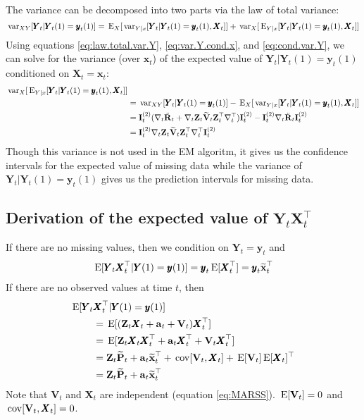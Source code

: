 \documentclass[]{article}
\def\XI{\mbox{\boldmath $\Xi$}}
\def\E{\,\textup{\textrm{E}}}
\def\IIm{\mbox{$\mathbf I$}}
\def\PP{\mbox{$\mathbf P$}}  \def\pp{\mbox{$\mathbf p$}}
\def\RR{\mbox{$\mathbf R$}}	 \def\rr{\mbox{$\mathbf r$}} \def\Rb{\mbox{$\mathbf H$}}	\def\Rm{\mathbb{R}}
\def\VV{\mbox{$\mathbf V$}}	\def\vv{\mbox{$\mathbf v$}}
\def\XX{\mbox{$\pmb{X}$}}	\def\xx{\mbox{$\pmb{x}$}}
\def\YY{\mbox{$\pmb{Y}$}}	\def\yy{\mbox{$\pmb{y}$}}
\def\ZZ{\mbox{$\mathbf Z$}}	\def\zz{\mbox{$\mathbf z$}}	\def\Zb{\mbox{$\mathbf M$}} \def\Za{\mbox{$\mathbf N$}} \def\Zm{\XI}
\def\var{\,\textup{\textrm{var}}}
\def\cov{\,\textup{\textrm{cov}}}
\def\hatxt{\widetilde{\mbox{$\mathbf x$}}_t}
\def\hatPt{\widetilde{\PP}_t}
\def\hatVt{\widetilde{\VV}_t}
\def\IR{\nabla}
\begin{document}
The variance can be decomposed into two parts via the law of total variance:
\begin{equation}\label{eq:law.total.var.Y}
\var_{XY}[\YY_t|\YY_t(1)=\yy_t(1)] = \E_X[\var_{Y|x}[\YY_t|\YY_t(1)=\yy_t(1),\XX_t]] + 
\var_X[\E_{Y|x}[\YY_t|\YY_t(1)=\yy_t(1),\XX_t]]
\end{equation}
Using equations \ref{eq:law.total.var.Y}, \ref{eq:var.Y.cond.x}, and \ref{eq:cond.var.Y}, we can solve for the variance (over $\xx_t$) of the expected value of $\YY_t|\YY_t(1)=\yy_t(1)$ conditioned on $\XX_t=\xx_t$:
\begin{equation}
\begin{split}
\var_X[\E_{Y|x}[\YY_t|\YY_t(1)=\yy_t(1),\XX_t]] & \\
&= \var_{XY}[\YY_t|\YY_t(1)=\yy_t(1)] - \E_X[\var_{Y|x}[\YY_t|\YY_t(1)=\yy_t(1),\XX_t]] \\
&= \IIm_t^{(2)}(\IR_t\ddot{\RR}_t + \IR_t\ZZ_t\hatVt\ZZ_t^\top\IR_t^\top)\IIm_t^{(2)} - \IIm_t^{(2)}\IR_t\ddot{\RR}_t\IIm_t^{(2)} \\
&= \IIm_t^{(2)}\IR_t\ZZ_t\hatVt\ZZ_t^\top\IR_t^\top\IIm_t^{(2)}
\end{split}
\end{equation}
Though this variance is not used in the EM algoritm, it gives us the confidence intervals for the expected value of missing data while the variance of $\YY_t|\YY_t(1)=\yy_t(1)$ gives us the prediction intervals for missing data.

\subsection{Derivation of the expected value of $\YY_t\XX_t^\top$}
If there are no missing values, then we condition on $\YY_t=\yy_t$ and
\begin{equation}
\begin{split}
\E[\YY_t \XX_t^\top|\YY(1)=\yy(1)] = \yy_t\E[\XX_t^\top]=\yy_t\hatxt^\top
\end{split}
\end{equation}
If there are no observed values at time $t$, then 
\begin{equation}
\begin{split}
\E[\YY_t &\XX_t^\top|\YY(1)=\yy(1)]\\ 
&=\E[(\ZZ_t\XX_t+\aa_t+\VV_t)\XX_t^\top]\\
&=\E[\ZZ_t\XX_t\XX_t^\top+\aa_t\XX_t^\top+\VV_t\XX_t^\top]\\
&=\ZZ_t\hatPt+\aa_t\hatxt^\top+\cov[\VV_t,\XX_t]+\E[\VV_t]\E[\XX_t]^\top\\
&=\ZZ_t\hatPt+\aa_t\hatxt^\top
\end{split}
\end{equation}
Note that $\VV_t$ and $\XX_t$ are independent (equation \ref{eq:MARSS}). $\E[\VV_t]=0$ and $\cov[\VV_t,\XX_t]=0$.
\end{document}
